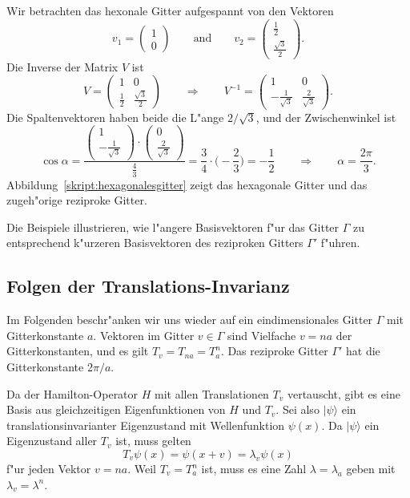 \begin{beispiel}
Wir betrachten das hexonale Gitter aufgespannt von den Vektoren
\[
v_1=\begin{pmatrix}1\\0\end{pmatrix}
\qquad\text{and}\qquad
v_2=\begin{pmatrix}\frac12\\\frac{\sqrt{3}}2\end{pmatrix}.
\]
Die Inverse der Matrix $V$ ist
\[
V=\begin{pmatrix}
1&0\\
\frac12&\frac{\sqrt{3}}2
\end{pmatrix}
\qquad\Rightarrow\qquad
V^{-1}=\begin{pmatrix}
1&0\\
-\frac1{\sqrt{3}}&\frac{2}{\sqrt{3}}
\end{pmatrix}.
\]
Die Spaltenvektoren haben beide die L"ange $2/\sqrt{3}$, und der
Zwischenwinkel ist 
\[
\cos\alpha
=
\frac{
\begin{pmatrix}1\\-\frac1{\sqrt{3}}\end{pmatrix}
\cdot
\begin{pmatrix}0\\\frac{2}{\sqrt{3}}\end{pmatrix}
}{\displaystyle\frac{4}{3}}
=
\frac{3}{4}\cdot \biggl(-\frac{2}{3}\biggr)
=
-\frac12
\qquad \Rightarrow \qquad
\alpha=\frac{2\pi}3.
\]
Abbildung~\ref{skript:hexagonalesgitter} zeigt das hexagonale Gitter 
und das zugeh"orige reziproke Gitter.
\end{beispiel}
Die Beispiele illustrieren, wie l"angere Basisvektoren f"ur das Gitter
$\Gamma$ zu entsprechend k"urzeren Basisvektoren des reziproken
Gitters $\Gamma'$ f"uhren.


\subsection{Folgen der Translations-Invarianz
\label{skript:translations-invarianz}}
Im Folgenden beschr"anken wir uns wieder auf ein eindimensionales Gitter
$\Gamma$ mit Gitterkonstante $a$.
Vektoren im Gitter $v\in\Gamma$ sind Vielfache $v=na$ der Gitterkonstanten,
und es gilt $T_{v}=T_{na}=T_a^n$.
Das reziproke Gitter $\Gamma'$ hat die Gitterkonstante $2\pi/a$.

Da der Hamilton-Operator $H$ mit allen Translationen $T_v$ vertauscht,
gibt es eine Basis aus gleichzeitigen Eigenfunktionen von $H$ und $T_v$.
Sei also $|\psi\rangle$ ein translationsinvarianter Eigenzustand mit
Wellenfunktion $\psi(x)$. Da $|\psi\rangle$ ein Eigenzustand aller $T_v$
ist, muss gelten
\[
T_v\psi(x)=\psi(x+v)=\lambda_v\psi(x)
\]
f"ur jeden Vektor $v=na$.
Weil $T_v=T_a^n$ ist, muss es eine Zahl $\lambda=\lambda_a$ geben mit
$\lambda_v=\lambda^n$.

